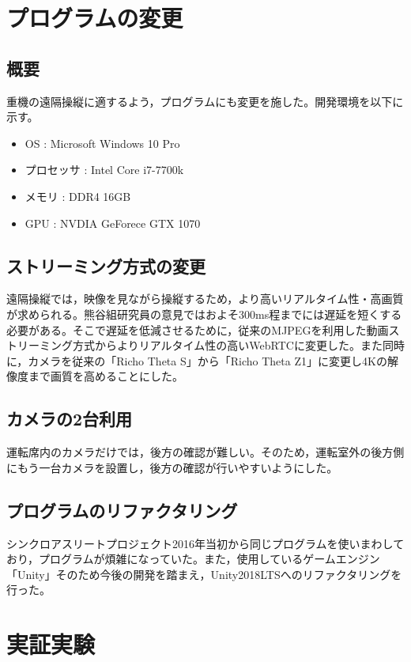 \documentclass[a4paper,12pt]{jsarticle}
\begin{document}
\clearpage

\section{プログラムの変更}
\subsection{概要}
重機の遠隔操縦に適するよう，プログラムにも変更を施した。開発環境を以下に示す。
\begin{itemize}
    \item OS : Microsoft Windows 10 Pro
    \item プロセッサ : Intel Core i7-7700k
    \item メモリ : DDR4 16GB
    \item GPU : NVDIA GeForece GTX 1070
\end{itemize}

\subsection{ストリーミング方式の変更}
遠隔操縦では，映像を見ながら操縦するため，より高いリアルタイム性・高画質が求められる。熊谷組研究員の意見ではおよそ300ms程までには遅延を短くする必要がある。そこで遅延を低減させるために，従来のMJPEGを利用した動画ストリーミング方式からよりリアルタイム性の高いWebRTCに変更した。また同時に，カメラを従来の「Richo Theta S」から「Richo Theta Z1」に変更し4Kの解像度まで画質を高めることにした。

\subsection{カメラの2台利用}
運転席内のカメラだけでは，後方の確認が難しい。そのため，運転室外の後方側にもう一台カメラを設置し，後方の確認が行いやすいようにした。

\subsection{プログラムのリファクタリング}
シンクロアスリートプロジェクト2016年当初から同じプログラムを使いまわしており，プログラムが煩雑になっていた。また，使用しているゲームエンジン「Unity」そのため今後の開発を踏まえ，Unity2018LTSへのリファクタリングを行った。

\clearpage

\section{実証実験}
\end{document}
